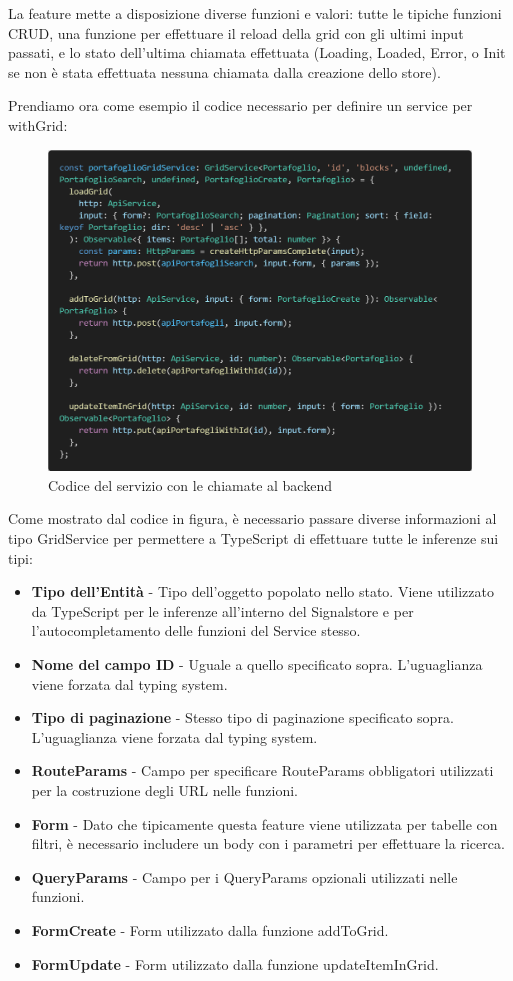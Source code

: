 La feature mette a disposizione diverse funzioni e valori: tutte le tipiche funzioni CRUD, una funzione per effettuare il reload della grid con gli ultimi input passati,
e lo stato dell'ultima chiamata effettuata (Loading, Loaded, Error, o Init se non \`e stata effettuata nessuna chiamata dalla creazione dello store).

Prendiamo ora come esempio il codice necessario per definire un service per withGrid:
\begin{figure}[H]
  \centering
  \includegraphics[width=12cm]{images/code-service.png}
  \caption{Codice del servizio con le chiamate al backend}
\end{figure}
\newpage
Come mostrato dal codice in figura, \`e necessario passare diverse informazioni al tipo GridService per permettere a TypeScript di effettuare tutte le inferenze sui tipi:
\begin{itemize}
  \item \textbf{Tipo dell'Entit\`a} - Tipo dell'oggetto popolato nello stato. Viene utilizzato da TypeScript per le inferenze all'interno del Signalstore e
    per l'autocompletamento delle funzioni del Service stesso.
  \item \textbf{Nome del campo ID} - Uguale a quello specificato sopra. L'uguaglianza viene forzata dal typing system.
  \item \textbf{Tipo di paginazione} - Stesso tipo di paginazione specificato sopra. L'uguaglianza viene forzata dal typing system.
  \item \textbf{RouteParams} - Campo per specificare RouteParams obbligatori utilizzati per la costruzione degli URL nelle funzioni.
  \item \textbf{Form} - Dato che tipicamente questa feature viene utilizzata per tabelle con filtri, \`e necessario includere un body con i parametri per effettuare la ricerca.
  \item \textbf{QueryParams} - Campo per i QueryParams opzionali utilizzati nelle funzioni.
  \item \textbf{FormCreate} - Form utilizzato dalla funzione addToGrid.
  \item \textbf{FormUpdate} - Form utilizzato dalla funzione updateItemInGrid.
\end{itemize}
